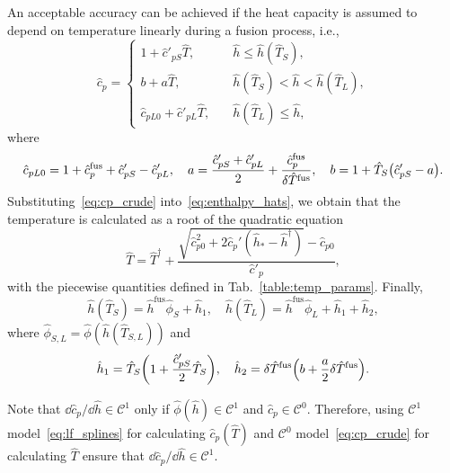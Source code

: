 \documentclass{article}
\newcommand{\fusion}[1]{{#1}^\mathrm{fus}}
\begin{document}
An acceptable accuracy can be achieved if the heat capacity is assumed
to depend on temperature linearly during a fusion process, i.e.,
\begin{equation}\label{eq:cp_crude}
	\hat{c}_p = \begin{cases}
        1 + \hat{c}'_{pS}\hat{T},             & \quad \hat{h} \leq \hat{h}(\hat{T}_S), \\
        b + a\hat{T},                         & \quad \hat{h}(\hat{T}_S) < \hat{h} < \hat{h}(\hat{T}_L), \\
        \hat{c}_{pL0} + \hat{c}'_{pL}\hat{T}, & \quad \hat{h}(\hat{T}_L) \leq \hat{h},
    \end{cases}
\end{equation}
where
\begin{equation*}
	\hat{c}_{pL0} = 1 + \fusion{\hat{c}_p} + \hat{c}'_{pS} - \hat{c}'_{pL}, \quad
	a = \frac{\hat{c}'_{pS} + \hat{c}'_{pL}}2 + \frac{\fusion{\hat{c}_p}}{\delta\fusion{\hat{T}}}, \quad
	b = 1 + \hat{T}_S\qty(\hat{c}'_{pS} - a).
\end{equation*}
Substituting~\eqref{eq:cp_crude} into~\eqref{eq:enthalpy_hats},
we obtain that the temperature is calculated as a root of the quadratic equation
\begin{equation}\label{eq:temp_crude}
	\hat{T} = \hat{T}^\dag + \frac{\sqrt{\hat{c}_{p0}^2 + 2\hat{c}_p'(\hat{h}_* - \hat{h}^\dag) } - \hat{c}_{p0}}{\hat{c}'_p},
\end{equation}
with the piecewise quantities defined in Tab.~\ref{table:temp_params}. Finally,
\begin{equation}\label{eq:enthalpySL_crude}
	\hat{h}(\hat{T}_S) = \fusion{\hat{h}}\hat{\phi}_S + \hat{h}_1, \quad \hat{h}(\hat{T}_L) = \fusion{\hat{h}}\hat{\phi}_L + \hat{h}_1 + \hat{h}_2,
\end{equation}
where \(\hat{\phi}_{S,L} = \hat{\phi}(\hat{h}(\hat{T}_{S,L}))\) and
\begin{equation*}
	\hat{h}_1 = \hat{T}_S\qty(1 + \frac{\hat{c}'_{pS}}2\hat{T}_S), \quad
	\hat{h}_2 = \delta\fusion{\hat{T}}\qty(b + \frac{a}2\delta\fusion{\hat{T}}).
\end{equation*}

Note that \(\dd\hat{c}_p/\dd\hat{h}\in\mathcal{C}^1\)
only if \(\hat{\phi}(\hat{h})\in\mathcal{C}^1\) and \(\hat{c}_p\in\mathcal{C}^0\).
Therefore, using \(\mathcal{C}^1\) model~\eqref{eq:lf_splines} for calculating \(\hat{c}_p(\hat{T})\)
and \(\mathcal{C}^0\) model~\eqref{eq:cp_crude} for calculating \(\hat{T}\)
ensure that \(\dd\hat{c}_p/\dd\hat{h}\in\mathcal{C}^1\).
\end{document}
